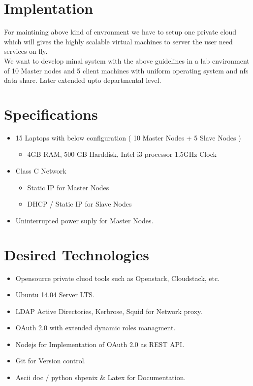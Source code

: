 \documentclass[12pt]{report}
\begin{document}
\section{Implentation}

	For maintining above kind of envronment we have to setup one private cloud which will gives the highly scalable virtual machines to server the user need services on fly.\\
	
	We want to develop minal system with the above guidelines in a lab environment of 10 Master nodes and 5 client machines with uniform operating system and nfs data share. Later extended upto departmental level.
	
	
\section{Specifications}

	\begin{itemize}
		\item 15 Laptops with below configuration ( 10 Master Nodes + 5 Slave Nodes )
			\begin{itemize}
				\item 4GB RAM, 500 GB Harddisk, Intel i3 processor 1.5GHz Clock
			\end{itemize}
		
		\item Class C Network 
			\begin{itemize}
			 	\item Static IP for Master Nodes
			 	\item DHCP / Static IP for Slave Nodes
			\end{itemize}
			
		\item Uninterrupted power suply for Master Nodes.
		
	\end{itemize}
	
\section{Desired Technologies}

	\begin{itemize}
		\item Opensource private cluod tools such as Openstack, Cloudstack, etc.
		\item Ubuntu 14.04 Server LTS.
		\item LDAP Active Directories, Kerbrose, Squid for Network proxy.
		\item OAuth 2.0 with extended dynamic roles managment.
		\item Nodejs for Implementation of OAuth 2.0 as REST API.
		\item Git for Version control. 
		\item Ascii doc / python shpenix \& Latex for Documentation.
	\end{itemize}
	
\end{document}
